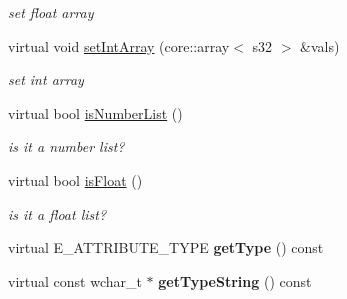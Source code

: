 \begin{DoxyCompactItemize}
\begin{DoxyCompactList}\small\item\em set float array \end{DoxyCompactList}\item 
\hypertarget{classirr_1_1io_1_1_c_numbers_attribute_a2d63c4a3950f8fd742ed47f30629ad76}{virtual void \hyperlink{classirr_1_1io_1_1_c_numbers_attribute_a2d63c4a3950f8fd742ed47f30629ad76}{set\-Int\-Array} (core\-::array$<$ s32 $>$ \&vals)}\label{classirr_1_1io_1_1_c_numbers_attribute_a2d63c4a3950f8fd742ed47f30629ad76}

\begin{DoxyCompactList}\small\item\em set int array \end{DoxyCompactList}\item 
\hypertarget{classirr_1_1io_1_1_c_numbers_attribute_a04cfbce45d042f9baf60a556d3867d07}{virtual bool \hyperlink{classirr_1_1io_1_1_c_numbers_attribute_a04cfbce45d042f9baf60a556d3867d07}{is\-Number\-List} ()}\label{classirr_1_1io_1_1_c_numbers_attribute_a04cfbce45d042f9baf60a556d3867d07}

\begin{DoxyCompactList}\small\item\em is it a number list? \end{DoxyCompactList}\item 
\hypertarget{classirr_1_1io_1_1_c_numbers_attribute_a7d9101ab84b8620ee8b74211dd25a3b9}{virtual bool \hyperlink{classirr_1_1io_1_1_c_numbers_attribute_a7d9101ab84b8620ee8b74211dd25a3b9}{is\-Float} ()}\label{classirr_1_1io_1_1_c_numbers_attribute_a7d9101ab84b8620ee8b74211dd25a3b9}

\begin{DoxyCompactList}\small\item\em is it a float list? \end{DoxyCompactList}\item 
\hypertarget{classirr_1_1io_1_1_c_numbers_attribute_a499db5f2253006caefb530902a39ac3b}{virtual E\-\_\-\-A\-T\-T\-R\-I\-B\-U\-T\-E\-\_\-\-T\-Y\-P\-E {\bfseries get\-Type} () const }\label{classirr_1_1io_1_1_c_numbers_attribute_a499db5f2253006caefb530902a39ac3b}

\item 
\hypertarget{classirr_1_1io_1_1_c_numbers_attribute_aac8e23d9899b986cceb7a9ca1ba35a69}{virtual const wchar\-\_\-t $\ast$ {\bfseries get\-Type\-String} () const }\label{classirr_1_1io_1_1_c_numbers_attribute_aac8e23d9899b986cceb7a9ca1ba35a69}

\end{DoxyCompactItemize}
